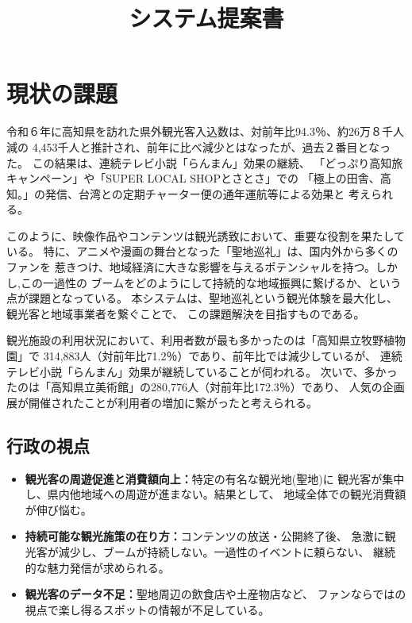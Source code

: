 \documentclass{docs}
\title{システム提案書}
\begin{document}
\section{現状の課題}
令和６年に高知県を訪れた県外観光客入込数は、対前年比94.3％、約26万８千人減の
4,453千人と推計され、前年に比べ減少とはなったが、過去２番目となった。
この結果は、連続テレビ小説「らんまん」効果の継続、
「どっぷり高知旅キャンペーン」や「SUPER LOCAL SHOPとさとさ」での
「極上の田舎、高知。」の発信、台湾との定期チャーター便の通年運航等による効果と
考えられる。

このように、映像作品やコンテンツは観光誘致において、重要な役割を果たしている。
特に、アニメや漫画の舞台となった「聖地巡礼」は、国内外から多くのファンを
惹きつけ、地域経済に大きな影響を与えるポテンシャルを持つ。しかし,この一過性の
ブームをどのようにして持続的な地域振興に繋げるか、という点が課題となっている。
本システムは、聖地巡礼という観光体験を最大化し、観光客と地域事業者を繋ぐことで、
この課題解決を目指すものである。

観光施設の利用状況において、利用者数が最も多かったのは「高知県立牧野植物園」で
314,883人（対前年比71.2％）であり、前年比では減少しているが、
連続テレビ小説「らんまん」効果が継続していることが伺われる。
次いで、多かったのは「高知県立美術館」の280,776人（対前年比172.3％）であり、
人気の企画展が開催されたことが利用者の増加に繋がったと考えられる。

\subsection{行政の視点}
\begin{itemize}
	\item \textbf{観光客の周遊促進と消費額向上：}特定の有名な観光地(聖地)に
	観光客が集中し、県内他地域への周遊が進まない。結果として、
	地域全体での観光消費額が伸び悩む。
	\item \textbf{持続可能な観光施策の在り方：}コンテンツの放送・公開終了後、
	急激に観光客が減少し、ブームが持続しない。一過性のイベントに頼らない、
	継続的な魅力発信が求められる。
	\item \textbf{観光客のデータ不足：}聖地周辺の飲食店や土産物店など、
	ファンならではの視点で楽し得るスポットの情報が不足している。
\end{itemize}
\end{document}
